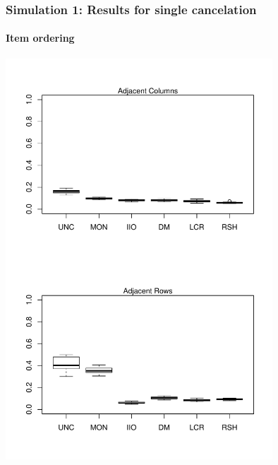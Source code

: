 \documentclass[10pt,serif,professionalfont]{beamer}
\begin{document}
\begin{frame}
    \frametitle{Simulation 1: Results for single cancelation}
        \framesubtitle{Item ordering}

    \centering \includegraphics[width=0.75\textwidth, clip, trim = 0 0 0 4.5in]{./figs/boxplots_single.pdf}

\end{frame}
\end{document}
